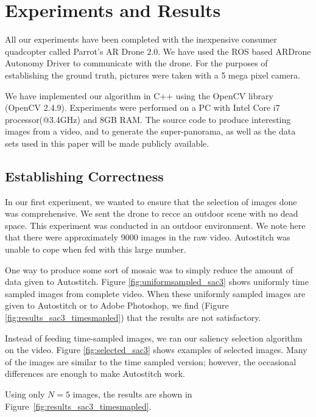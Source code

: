 \section{Experiments and Results}
\label{sec:results}

All our experiments have been completed with the inexpensive consumer
quadcopter called Parrot's AR Drone 2.0. We have used the ROS based
ARDrone Autonomy Driver to communicate with the drone. For the
purposes of establishing the ground truth, pictures were taken with a
5 mega pixel camera.

We have implemented our algorithm in C++ using the OpenCV library
(OpenCV 2.4.9). Experiments were performed on a PC with Intel Core i7
processor(@3.4GHz) and 8GB RAM.  The source code to produce
interesting images from a video, and to generate the super-panorama,
as well as the data sets used in this paper will be made publicly
available.


\subsection{Establishing Correctness}

In our first experiment, we wanted to ensure that the selection of
images done was comprehensive.  We sent the drone to recce an outdoor
scene with no dead space. This experiment was conducted in an outdoor
environment. We note here that there were approximately 9000 images in
the raw video.  Autostitch was unable to cope when fed with this large
number. 

One way to produce some sort of mosaic was to simply reduce the amount
of data given to Autostitch.  Figure \ref{fig:uniformsampled_sac3}
shows uniformly time sampled images from complete video.  When these
uniformly sampled images are given to Autostitch or to Adobe
Photoshop, we find (Figure \ref{fig:results_sac3_timesmapled})  that the
results are not satisfactory.

Instead of feeding time-sampled images, we ran our saliency selection
algorithm on the video. Figure \ref{fig:selected_sac3} shows examples of
selected images. Many of the images are similar to the time sampled
version; however, the occasional differences are enough to make
Autostitch work. 

Using only $N=5$ images, the results are shown in
Figure~\ref{fig:results_sac3_timesmapled}.


